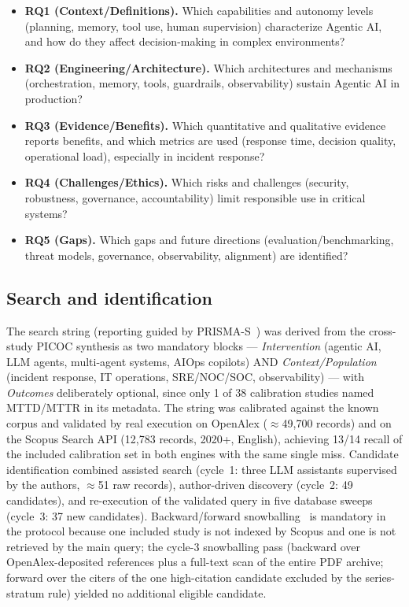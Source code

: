 \documentclass{ieeeaccess}
\begin{document}
\begin{itemize}
  \item \textbf{RQ1 (Context/Definitions).} Which capabilities and
        autonomy levels (planning, memory, tool use, human supervision)
        characterize Agentic AI, and how do they affect decision-making
        in complex environments?
  \item \textbf{RQ2 (Engineering/Architecture).} Which architectures and
        mechanisms (orchestration, memory, tools, guardrails,
        observability) sustain Agentic AI in production?
  \item \textbf{RQ3 (Evidence/Benefits).} Which quantitative and
        qualitative evidence reports benefits, and which metrics are
        used (response time, decision quality, operational load),
        especially in incident response?
  \item \textbf{RQ4 (Challenges/Ethics).} Which risks and challenges
        (security, robustness, governance, accountability) limit
        responsible use in critical systems?
  \item \textbf{RQ5 (Gaps).} Which gaps and future directions
        (evaluation/benchmarking, threat models, governance,
        observability, alignment) are identified?
\end{itemize}

\subsection{Search and identification}
The search string (reporting guided by
PRISMA-S~\cite{rethlefsen2021prismas}) was derived from the cross-study
PICOC synthesis as two mandatory blocks --- \emph{Intervention} (agentic AI, LLM agents,
multi-agent systems, AIOps copilots) AND \emph{Context/Population}
(incident response, IT operations, SRE/NOC/SOC, observability) ---
with \emph{Outcomes} deliberately optional, since only 1 of 38 calibration
studies named MTTD/MTTR in its metadata. The string was calibrated
against the known corpus and validated by real execution on OpenAlex
($\approx$49{,}700 records) and on the Scopus Search API (12{,}783
records, 2020+, English), achieving 13/14 recall of the included
calibration set in both engines with the same single miss. Candidate
identification combined assisted search (cycle~1: three LLM assistants
supervised by the authors, $\approx$51 raw records), author-driven discovery (cycle~2:
49 candidates), and re-execution of the validated query in five database
sweeps (cycle~3: 37 new candidates). Backward/forward snowballing~\cite{wohlin2014} is
mandatory in the protocol because one included study is not indexed by
Scopus and one is not retrieved by the main query; the cycle-3
snowballing pass (backward over OpenAlex-deposited references plus a
full-text scan of the entire PDF archive; forward over the citers of the
one high-citation candidate excluded by the series-stratum rule) yielded
no additional eligible candidate.
\end{document}
